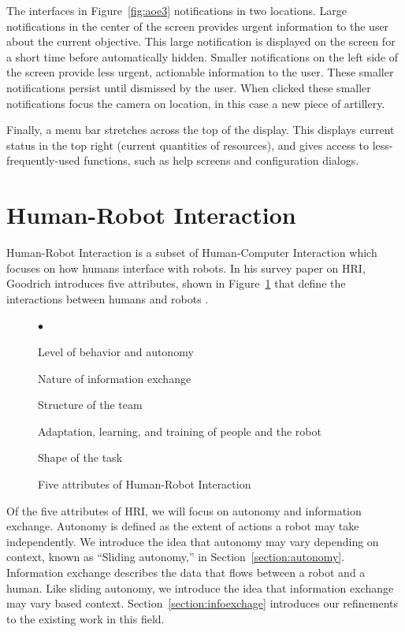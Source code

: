 The interfaces in Figure~\ref{fig:aoe3} notifications in two locations. Large notifications in the center of the screen provides urgent information to the user about the current objective. This large notification is displayed on the screen for a short time before automatically hidden. Smaller notifications on the left side of the screen provide less urgent, actionable information to the user. These smaller notifications persist until dismissed by the user. When clicked these smaller notifications focus the camera on location, in this case a new piece of artillery.

Finally, a menu bar stretches across the top of the display. This displays current status in the top right (current quantities of resources), and gives access to less-frequently-used functions, such as help screens and configuration dialogs.



\section{Human-Robot Interaction}
Human-Robot Interaction is a subset of Human-Computer Interaction which focuses on how humans interface with robots. In his survey paper on HRI, Goodrich introduces five attributes, shown in Figure~\ref{fig:five-attributes} that define the interactions between humans and robots \cite{Goodrich_Survey}.

\begin{figure}[ht]
	\makebox[\textwidth]{\hrulefill}
	\begin{list}{$\bullet$}
		\item Level of behavior and autonomy
		\item \item Nature of information exchange %
		\item Structure of the team
		\item Adaptation, learning, and training of people and the robot
		\item Shape of the task
	\end{list}
	\makebox[\textwidth]{\hrulefill}
	\caption{Five attributes of Human-Robot Interaction \label{fig:five-attributes}}
\end{figure}

Of the five attributes of HRI, we will focus on autonomy and information exchange. Autonomy is defined as the extent of actions a robot may take independently. We introduce the idea that autonomy may vary depending on context, known as ``Sliding autonomy,'' in Section~\ref{section:autonomy}. Information exchange describes the data that flows between a robot and a human. Like sliding autonomy, we introduce the idea that information exchange may vary based context. Section~\ref{section:infoexchage} introduces our refinements to the existing work in this field.

